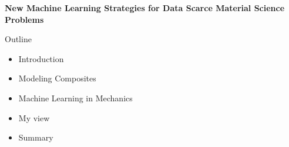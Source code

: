 \documentclass[aspectratio=169]{beamer}
\author{\authorlabel}
\newcommand{\mysubtitle}{\color{Pink}\Large{\textbf{New Machine Learning Strategies for Data Scarce Material Science Problems}}}
\begin{document}


\begin{frame}
  \centering
  \mysubtitle
\end{frame}

\begin{frame}{Outline}
  \centering
  \begin{itemize}
    \item Introduction
    \item Modeling Composites
    \item Machine Learning in Mechanics
    \item My view 
    \item Summary
  \end{itemize}
\end{frame}




\end{document}
